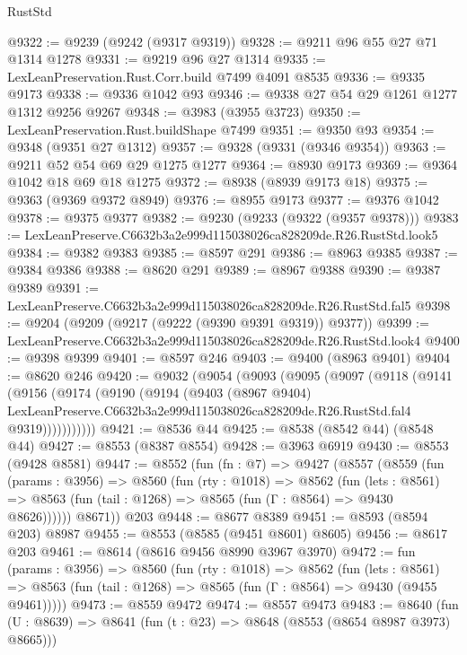 \begin{lexlean}{RustStd}
\begin{coremodule}
@9322 := @9239 (@9242 (@9317 @9319))
@9328 := @9211 @96 @55 @27 @71 @1314 @1278
@9331 := @9219 @96 @27 @1314
@9335 := LexLeanPreservation.Rust.Corr.build @7499 @4091 @8535
@9336 := @9335 @9173
@9338 := @9336 @1042 @93
@9346 := @9338 @27 @54 @29 @1261 @1277 @1312 @9256 @9267
@9348 := @3983 (@3955 @3723)
@9350 := LexLeanPreservation.Rust.buildShape @7499
@9351 := @9350 @93
@9354 := @9348 (@9351 @27 @1312)
@9357 := @9328 (@9331 (@9346 @9354))
@9363 := @9211 @52 @54 @69 @29 @1275 @1277
@9364 := @8930 @9173
@9369 := @9364 @1042 @18 @69 @18 @1275
@9372 := @8938 (@8939 @9173 @18)
@9375 := @9363 (@9369 @9372 @8949)
@9376 := @8955 @9173
@9377 := @9376 @1042
@9378 := @9375 @9377
@9382 := @9230 (@9233 (@9322 (@9357 @9378)))
@9383 := LexLeanPreserve.C6632b3a2e999d115038026ca828209de.R26.RustStd.look5
@9384 := @9382 @9383
@9385 := @8597 @291
@9386 := @8963 @9385
@9387 := @9384 @9386
@9388 := @8620 @291
@9389 := @8967 @9388
@9390 := @9387 @9389
@9391 := LexLeanPreserve.C6632b3a2e999d115038026ca828209de.R26.RustStd.fal5
@9398 := @9204 (@9209 (@9217 (@9222 (@9390 @9391 @9319)) @9377))
@9399 := LexLeanPreserve.C6632b3a2e999d115038026ca828209de.R26.RustStd.look4
@9400 := @9398 @9399
@9401 := @8597 @246
@9403 := @9400 (@8963 @9401)
@9404 := @8620 @246
@9420 := @9032
    (@9054
      (@9093
        (@9095
          (@9097
            (@9118
              (@9141
                (@9156
                  (@9174
                    (@9190
                      (@9194
                        (@9403
                          (@8967 @9404)
                          LexLeanPreserve.C6632b3a2e999d115038026ca828209de.R26.RustStd.fal4
                          @9319)))))))))))
@9421 := @8536 @44
@9425 := @8538 (@8542 @44) (@8548 @44)
@9427 := @8553 (@8387 @8554)
@9428 := @3963 @6919
@9430 := @8553 (@9428 @8581)
@9447 := @8552
    (fun (fn : @7) =>
    @9427
      (@8557
        (@8559
          (fun (params : @3956) =>
          @8560
            (fun (rty : @1018) =>
            @8562
              (fun (lets : @8561) =>
              @8563 (fun (tail : @1268) => @8565 (fun (Γ : @8564) => @9430 @8626))))))
        @8671))
    @203
@9448 := @8677 @8389
@9451 := @8593 (@8594 @203) @8987
@9455 := @8553 (@8585 (@9451 @8601) @8605)
@9456 := @8617 @203
@9461 := @8614 (@8616 @9456 @8990 @3967 @3970)
@9472 := fun (params : @3956) =>
  @8560
    (fun (rty : @1018) =>
    @8562
      (fun (lets : @8561) =>
      @8563 (fun (tail : @1268) => @8565 (fun (Γ : @8564) => @9430 (@9455 @9461)))))
@9473 := @8559 @9472
@9474 := @8557 @9473
@9483 := @8640 (fun (U : @8639) => @8641 (fun (t : @23) => @8648 (@8553 (@8654 @8987 @3973) @8665)))

\end{coremodule}
\end{lexlean}
